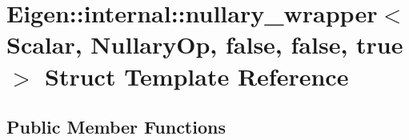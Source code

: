 \hypertarget{struct_eigen_1_1internal_1_1nullary__wrapper_3_01_scalar_00_01_nullary_op_00_01false_00_01false_00_01true_01_4}{}\section{Eigen\+:\+:internal\+:\+:nullary\+\_\+wrapper$<$ Scalar, Nullary\+Op, false, false, true $>$ Struct Template Reference}
\label{struct_eigen_1_1internal_1_1nullary__wrapper_3_01_scalar_00_01_nullary_op_00_01false_00_01false_00_01true_01_4}
\subsection*{Public Member Functions}
